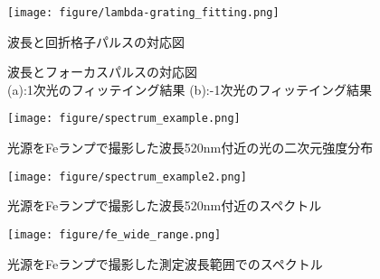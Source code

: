 \begin{figure}[htbp]
    \centering
    \texttt{[image: figure/lambda-grating\_fitting.png]}
    \caption{波長と回折格子パルスの対応図}
\end{figure}


\begin{figure}
    \caption{波長とフォーカスパルスの対応図\\
    (a):1次光のフィッテイング結果
    (b):-1次光のフィッテイング結果}
\end{figure}

\begin{figure}[htbp]
    \centering
    \texttt{[image: figure/spectrum\_example.png]}
    \caption{光源をFeランプで撮影した波長520nm付近の光の二次元強度分布}
\end{figure}

\begin{figure}[htbp]
    \centering
    \texttt{[image: figure/spectrum\_example2.png]}
    \caption{光源をFeランプで撮影した波長520nm付近のスペクトル}
\end{figure}

\begin{figure}[htbp]
    \centering
    \texttt{[image: figure/fe\_wide\_range.png]}
    \caption{光源をFeランプで撮影した測定波長範囲でのスペクトル}
\end{figure}


